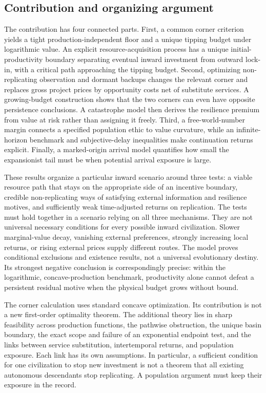 \subsection{Contribution and organizing argument}
The contribution has four connected parts. First, a common corner criterion
yields a tight production-independent floor and a unique tipping budget
under logarithmic value. An explicit resource-acquisition process has a
unique initial-productivity boundary separating eventual inward investment
from outward lock-in, with a critical path approaching the tipping budget.
Second, optimizing non-replicating observation and dormant backups changes
the relevant corner and replaces gross project prices by opportunity costs
net of substitute services. A growing-budget construction shows that the two corners can even have opposite persistence conclusions. A catastrophe model then derives the resilience
premium from value at risk rather than assigning it freely. Third, a
free-world-number margin connects a specified population ethic to value
curvature, while an infinite-horizon benchmark and subjective-delay
inequalities make continuation returns explicit. Finally, a marked-origin
arrival model quantifies how small the expansionist tail must be when
potential arrival exposure is large.

These results organize a particular inward scenario around three tests:
a viable resource path that stays on the appropriate side of an incentive
boundary, credible non-replicating ways of satisfying external information
and resilience motives, and sufficiently weak time-adjusted returns on
replication. The tests must hold together in a scenario relying on all
three mechanisms. They are not universal necessary conditions for every
possible inward civilization. Slower marginal-value decay, vanishing
external preferences, strongly increasing local returns, or rising external
prices supply different routes. The model proves conditional exclusions
and existence results, not a universal evolutionary destiny. Its strongest
negative conclusion is correspondingly precise: within the logarithmic,
concave-production benchmark, productivity alone cannot defeat a persistent
residual motive when the physical budget grows without bound.

The corner calculation uses standard concave optimization. Its contribution
is not a new first-order optimality theorem. The additional theory lies in
sharp feasibility across production functions, the pathwise obstruction,
the unique basin boundary, the exact scope and failure of an exponential
endpoint test, and the links between service substitution, intertemporal
returns, and population exposure. Each link has its own assumptions. In
particular, a sufficient condition for one civilization to stop new
investment is not a theorem that all existing autonomous descendants stop
replicating. A population argument must keep their exposure in the record.

